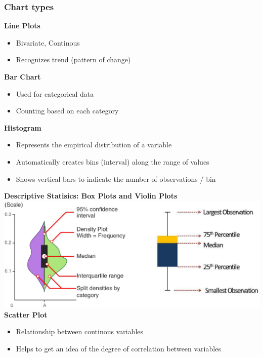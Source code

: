 \subsubsection{Chart types}
\textbf{Line Plots}
\begin{itemize}
    \item Bivariate, Continous
    \item Recognizes trend (pattern of change)
\end{itemize}
\textbf{Bar Chart}
\begin{itemize}
    \item Used for categorical data
    \item Counting based on each category
\end{itemize}
\textbf{Histogram}
\begin{itemize}
    \item Represents the empirical distribution of a variable
    \item Automatically creates bins (interval) along the range of values
    \item Shows vertical bars to indicate the number of observations / bin
\end{itemize}
\textbf{Descriptive Statisics: Box Plots and Violin Plots}\\
\includegraphics[width=\linewidth]{./img/descriptive_statistics.png}
\textbf{Scatter Plot}
\begin{itemize}
    \item Relationship between continous variables
    \item Helps to get an idea of the degree of correlation between variables
\end{itemize}